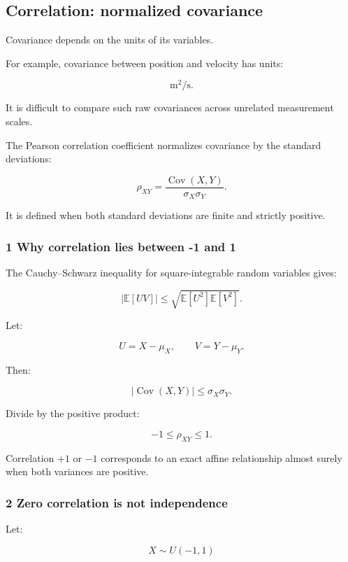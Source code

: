 \subsection{Correlation: normalized covariance}\label{02-foundations-ii-ch023-correlation-normalized-covariance}

Covariance depends on the units of its variables.

For example, covariance between position and velocity has units:

\[
 \mathrm{m^2/s}.
\]

It is difficult to compare such raw covariances across unrelated measurement scales.

The Pearson correlation coefficient normalizes covariance by the standard deviations:

\[
 \boxed{ \rho_{XY}= \frac{ \operatorname{Cov}(X,Y) }{ \sigma_X\sigma_Y } }.
\]

It is defined when both standard deviations are finite and strictly positive.

\subsubsection{1 Why correlation lies between -1 and 1}\label{02-foundations-ii-ch023-why-correlation-lies-between--1-and-1}

The Cauchy--Schwarz inequality for square-integrable random variables gives:

\[
 |\mathbb E[UV]| \le \sqrt{\mathbb E[U^2]\mathbb E[V^2]}.
\]

Let:

\[
 U=X-\mu_X, \qquad V=Y-\mu_Y.
\]

Then:

\[
 |\operatorname{Cov}(X,Y)| \le \sigma_X\sigma_Y.
\]

Divide by the positive product:

\[
 \boxed{ -1\le\rho_{XY}\le1 }.
\]

Correlation \(+1\) or \(-1\) corresponds to an exact affine relationship almost surely when both variances are positive.

\subsubsection{2 Zero correlation is not independence}\label{02-foundations-ii-ch023-zero-correlation-is-not-independence}

Let:

\[
 X\sim U(-1,1)
\]

